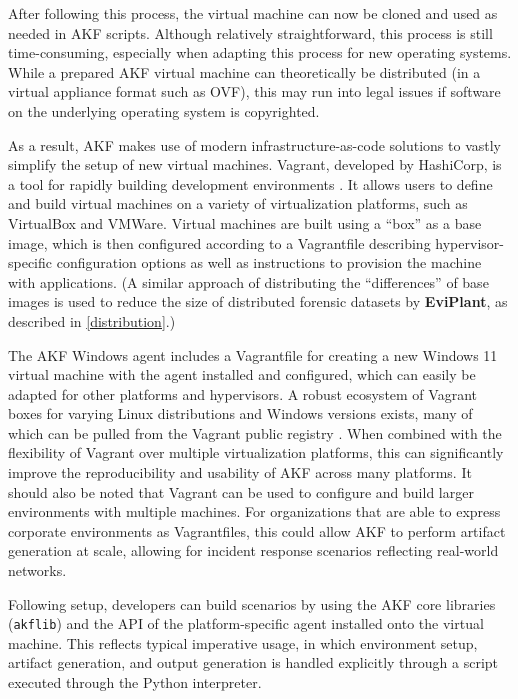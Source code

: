 \documentclass[letterpaper,12pt]{report}
\newcommand{\passthrough}[1]{#1}
\begin{document}
After following this process, the virtual machine can now be cloned and
used as needed in AKF scripts. Although relatively straightforward, this
process is still time-consuming, especially when adapting this process
for new operating systems. While a prepared AKF virtual machine can
theoretically be distributed (in a virtual appliance format such as
OVF), this may run into legal issues if software on the underlying
operating system is copyrighted.

As a result, AKF makes use of modern infrastructure-as-code solutions to
vastly simplify the setup of new virtual machines. Vagrant, developed by
HashiCorp, is a tool for rapidly building development environments
\cite{HashicorpVagrant2025}. It allows users to define and build
virtual machines on a variety of virtualization platforms, such as
VirtualBox and VMWare. Virtual machines are built using a ``box'' as a
base image, which is then configured according to a Vagrantfile
describing hypervisor-specific configuration options as well as
instructions to provision the machine with applications. (A similar
approach of distributing the ``differences'' of base images is used to
reduce the size of distributed forensic datasets by \textbf{EviPlant},
as described in \autoref{distribution}.)

The AKF Windows agent includes a Vagrantfile for creating a new Windows
11 virtual machine with the agent installed and configured, which can
easily be adapted for other platforms and hypervisors. A robust
ecosystem of Vagrant boxes for varying Linux distributions and Windows
versions exists, many of which can be pulled from the Vagrant public
registry \cite{hashicorpHashiCorpCloudPlatform}. When combined with
the flexibility of Vagrant over multiple virtualization platforms, this
can significantly improve the reproducibility and usability of AKF
across many platforms. It should also be noted that Vagrant can be used
to configure and build larger environments with multiple machines. For
organizations that are able to express corporate environments as
Vagrantfiles, this could allow AKF to perform artifact generation at
scale, allowing for incident response scenarios reflecting real-world
networks.

Following setup, developers can build scenarios by using the AKF core
libraries (\passthrough{\lstinline!akflib!}) and the API of the
platform-specific agent installed onto the virtual machine. This
reflects typical imperative usage, in which environment setup, artifact
generation, and output generation is handled explicitly through a script
executed through the Python interpreter.
\end{document}
